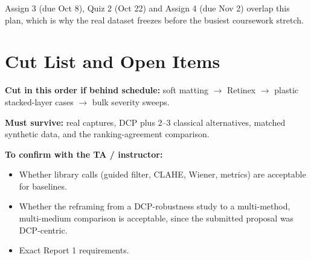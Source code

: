 \documentclass[12pt,a4paper]{article}
\begin{document}
Assign 3 (due Oct 8), Quiz 2 (Oct 22) and Assign 4 (due Nov 2) overlap
this plan, which is why the real dataset freezes before the busiest
coursework stretch.

\section{Cut List and Open Items}
\label{sec:cutlist}

\textbf{Cut in this order if behind schedule:} soft matting
$\rightarrow$ Retinex $\rightarrow$ plastic stacked-layer cases
$\rightarrow$ bulk severity sweeps.

\textbf{Must survive:} real captures, DCP plus 2--3 classical
alternatives, matched synthetic data, and the ranking-agreement
comparison.

\textbf{To confirm with the TA / instructor:}
\begin{itemize}[nosep]
  \item Whether library calls (guided filter, CLAHE, Wiener, metrics)
        are acceptable for baselines.
  \item Whether the reframing from a DCP-robustness study to a
        multi-method, multi-medium comparison is acceptable, since the
        submitted proposal was DCP-centric.
  \item Exact Report 1 requirements.
\end{itemize}
\end{document}

